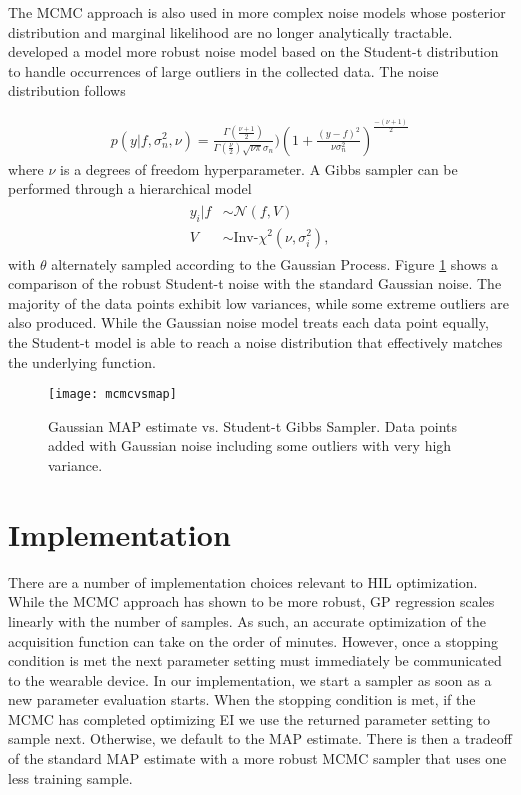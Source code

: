 The MCMC approach is also used in more complex noise models whose posterior distribution and marginal likelihood are no longer analytically tractable. \citet{NIPS2009_3806,Jylanki:2011:RGP:1953048.2078209} developed a model more robust noise model based on the Student-t distribution to handle occurrences of large outliers in the collected data. The noise distribution follows

\begin{align}
p(y\vert f,\sigma_n^2,\nu) = \frac{\Gamma (\frac{\nu + 1}{2})}{\Gamma(\frac{\nu}{2})\sqrt{\nu\pi}\sigma_n})(1 + \frac{(y-f)^2}{\nu\sigma_n^2})^{\frac{-(\nu + 1)}{2}}
\end{align} 
where $\nu$ is a degrees of freedom hyperparameter. A Gibbs sampler can be performed through a hierarchical model
\begin{align}
\begin{split}
y_i\vert f &\sim \mathcal{N}(f, V)\\
V &\sim \text{Inv-}\chi^2(\nu, \sigma_i^2),
\end{split}
\end{align}
with $\theta$ alternately sampled according to the Gaussian Process. Figure \ref{fig:mcmcvsmap} shows a comparison of the robust Student-t noise with the standard Gaussian noise. The majority of the data points exhibit low variances, while some extreme outliers are also produced. While the Gaussian noise model treats each data point equally, the Student-t model is able to reach a noise distribution that effectively matches the underlying function.

\begin{figure}[t]
\centering
\texttt{[image: mcmcvsmap]}
\caption{Gaussian MAP estimate vs. Student-t Gibbs Sampler. Data points added with Gaussian noise including some outliers with very high variance.}
\label{fig:mcmcvsmap}
\end{figure}

\section{Implementation}
There are a number of implementation choices relevant to HIL optimization. While the MCMC approach has shown to be more robust, GP regression scales linearly with the number of samples. As such, an accurate optimization of the acquisition function can take on the order of minutes. However, once a stopping condition is met the next parameter setting must immediately be communicated to the wearable device. In our implementation, we start a sampler as soon as a new parameter evaluation starts. When the stopping condition is met, if the MCMC has completed optimizing EI we use the returned parameter setting to sample next. Otherwise, we default to the MAP estimate. There is then a tradeoff of the standard MAP estimate with a more robust MCMC sampler that uses one less training sample.

